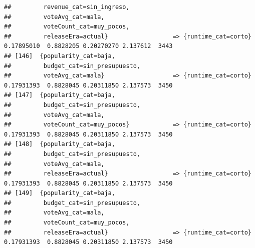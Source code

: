 \documentclass[
]{article}
\begin{document}
\begin{verbatim}
##         revenue_cat=sin_ingreso,                                                                                                
##         voteAvg_cat=mala,                                                                                                       
##         voteCount_cat=muy_pocos,                                                                                                
##         releaseEra=actual}                  => {runtime_cat=corto}               0.17895010  0.8828205 0.20270270 2.137612  3443
## [146]  {popularity_cat=baja,                                                                                                    
##         budget_cat=sin_presupuesto,                                                                                             
##         voteAvg_cat=mala}                   => {runtime_cat=corto}               0.17931393  0.8828045 0.20311850 2.137573  3450
## [147]  {popularity_cat=baja,                                                                                                    
##         budget_cat=sin_presupuesto,                                                                                             
##         voteAvg_cat=mala,                                                                                                       
##         voteCount_cat=muy_pocos}            => {runtime_cat=corto}               0.17931393  0.8828045 0.20311850 2.137573  3450
## [148]  {popularity_cat=baja,                                                                                                    
##         budget_cat=sin_presupuesto,                                                                                             
##         voteAvg_cat=mala,                                                                                                       
##         releaseEra=actual}                  => {runtime_cat=corto}               0.17931393  0.8828045 0.20311850 2.137573  3450
## [149]  {popularity_cat=baja,                                                                                                    
##         budget_cat=sin_presupuesto,                                                                                             
##         voteAvg_cat=mala,                                                                                                       
##         voteCount_cat=muy_pocos,                                                                                                
##         releaseEra=actual}                  => {runtime_cat=corto}               0.17931393  0.8828045 0.20311850 2.137573  3450

\end{verbatim}
\end{document}
